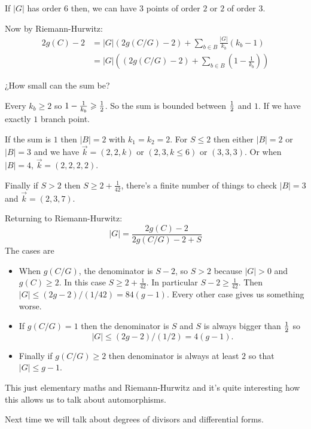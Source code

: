 \documentclass[12pt]{memoir}
\begin{document}
\begin{Rmk}
    If $|G|$ has order $6$ then, we can have $3$ points of order $2$ or $2$ of order $3$.
\end{Rmk}

Now by Riemann-Hurwitz:
\begin{align*}
2g(C)-2&=|G|(2g(C/G)-2)+\sum_{b\in B}\frac{|G|}{k_b}(k_b-1)\\
&=|G|\left((2g(C/G)-2)+\sum_{b\in B}\left(1-\frac{1}{k_b}\right)\right)
\end{align*}

\begin{center}
    ¿How small can the sum be?
\end{center}

Every $k_b\geq 2$ so $1-\frac{1}{k_b}\geq\half$. So the sum is bounded between $\half$ and $1$. If we have exactly $1$ branch point.\par
If the sum is $1$ then $|B|=2$ with $k_1=k_2=2$. For $S\leq 2$ then either $|B|=2$ or $|B|=3$ and we have $\vec{k}=(2,2,k)$ or $(2,3,k\leq 6)$ or $(3,3,3)$. Or when $|B|=4$, $\vec{k}=(2,2,2,2)$.\par
Finally if $S>2$ then $S\geq 2+\frac{1}{42}$, there's a finite number of things to check $|B|=3$ and $\vec{k}=(2,3,7)$.\par
Returning to Riemann-Hurwitz:
$$|G|=\frac{2g(C)-2}{2g(C/G)-2+S}$$
The cases are 
\begin{itemize}
    \item When $g(C/G)$, the denominator is $S-2$, so $S>2$ because $|G|>0$ and $g(C)\geq 2$. In this case $S\geq 2+\frac{1}{42}$.
    In particular $S-2\geq \frac{1}{42}$. Then $|G|\leq (2g-2)/(1/42)=84(g-1)$. Every other case gives us something worse.
    \item If $g(C/G)=1$ then the denominator is $S$ and $S$ is always bigger than $\half$ so 
    $$|G|\leq (2g-2)/(1/2)=4(g-1).$$
    \item Finally if $g(C/G)\geq 2$ then denominator is always at least $2$ so that $|G|\leq g-1$.
\end{itemize}
This just elementary maths and Riemann-Hurwitz and it's quite interesting how this allows us to talk about automorphisms.\par
Next time we will talk about degrees of divisors and differential forms.

\ifx\nextra\undefined
\printindex
\else\fi
\nocite{*}


\end{document}
